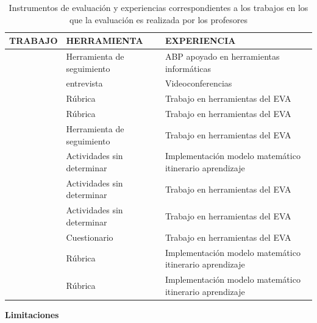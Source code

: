 \begin{table}
  \begin{center}
  \begin{tabular}{| c | m{4.5cm} | m{6.5cm} |}
    \hline
    TRABAJO & HERRAMIENTA & EXPERIENCIA \\
    \hline
    \hline
    \cite{lacuesta2009active} & Herramienta de seguimiento  & ABP apoyado en herramientas informáticas \\
    \hline
    \cite{ward2011developing} & entrevista & Videoconferencias \\
    \hline
    \cite{martin2013acquired} & Rúbrica & Trabajo en herramientas del EVA \\
    \hline
    \cite{rodriguez2010portfolio} & Rúbrica & Trabajo en herramientas del EVA  \\
    \hline
    \cite{benlloch2007adapting} & Herramienta de seguimiento & Trabajo en herramientas del EVA \\
    \hline
    \cite{yang2014fine} & Actividades sin determinar  & Implementación modelo matemático itinerario aprendizaje \\
    \hline
    \cite{serrano2013hiperion} & Actividades sin determinar  & Trabajo en herramientas del EVA \\
    \hline
    \cite{starcic2008sustaining} & Actividades sin determinar  & Trabajo en herramientas del EVA \\
    \hline
    \cite{vizcarro2013assessment} & Cuestionario  & Trabajo en herramientas del EVA \\
    \hline
    \cite{rashid2008engineering} & Rúbrica & Implementación modelo matemático itinerario aprendizaje \\
    \hline
    \cite{aziz2007appraisal} & Rúbrica & Implementación modelo matemático itinerario aprendizaje \\
    \hline
    \end{tabular}
\end{center}
\caption{Instrumentos de evaluación y experiencias correspondientes a los trabajos en los que la evaluación es realizada por los profesores}
\label{tab:MetodosProfesor}
\end{table} 

\bigskip
\textbf{Limitaciones}
\bigskip

